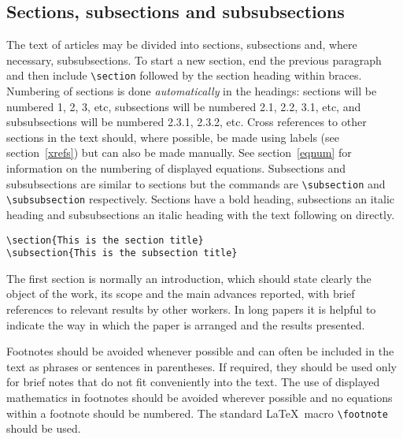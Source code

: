 \documentclass[12pt]{iopart}
\begin{document}
\subsection{Sections, subsections and subsubsections}
The text of articles may be divided into sections, subsections and, where necessary, 
subsubsections. To start a new section, end the previous paragraph and 
then include \verb"\section" followed by the section heading within braces. 
Numbering of sections is done {\it automatically} in the headings: 
sections will be numbered 1, 2, 3, etc, subsections will be numbered 
2.1, 2.2,  3.1, etc, and subsubsections will be numbered 2.3.1, 2.3.2, 
etc.  Cross references to other sections in the text should, where
possible, be made using 
labels (see section~\ref{xrefs}) but can also
be made manually. See section~\ref{eqnum} for information on the numbering of displayed equations. Subsections and subsubsections are 
similar to sections but 
the commands are \verb"\subsection" and \verb"\subsubsection" respectively. 
Sections have a bold heading, subsections an italic heading and 
subsubsections an italic heading with the text following on directly.
\small\begin{verbatim}
\section{This is the section title}
\subsection{This is the subsection title}
\end{verbatim}\normalsize

The first section is normally an introduction,  which should state clearly 
the object of the work, its scope and the main advances reported, with 
brief references to relevant results by other workers. In long papers it is 
helpful to indicate the way in which the paper is arranged and the results 
presented.

Footnotes should be avoided whenever possible and can often be included in the text as phrases or sentences in parentheses. If required, they should be used only for brief notes that do not fit conveniently into the text. The use of 
displayed mathematics in footnotes should be avoided wherever possible and no equations within a footnote should be numbered. 
The standard \LaTeX\ macro \verb"\footnote" should be used.  
\end{document}
